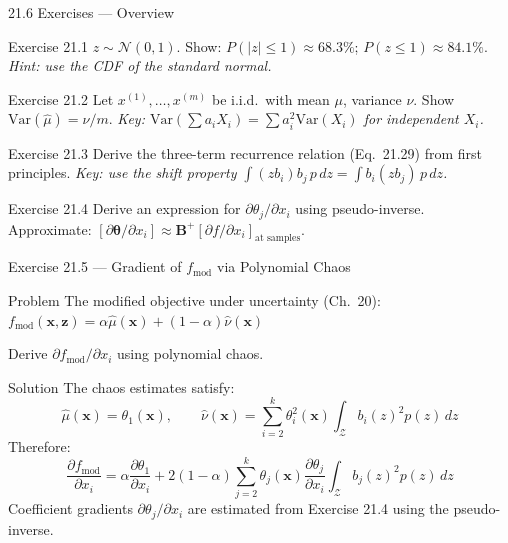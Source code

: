 \documentclass[aspectratio=169,10pt]{beamer}
\newcommand{\bx}{\mathbf{x}}
\newcommand{\bz}{\mathbf{z}}
\newcommand{\Var}{\mathrm{Var}}
\newcommand{\hmu}{\hat{\mu}}
\newcommand{\hnu}{\hat{\nu}}
\begin{document}
\begin{frame}{21.6 Exercises --- Overview}
  \begin{block}{Exercise 21.1}
    $z\sim\mathcal{N}(0,1)$.
    Show: $P(|z|\le 1)\approx 68.3\%$;\;
    $P(z\le 1)\approx 84.1\%$.
    \textit{Hint: use the CDF of the standard normal.}
  \end{block}

  \begin{block}{Exercise 21.2}
    Let $x^{(1)},\ldots,x^{(m)}$ be i.i.d.\ with mean $\mu$, variance $\nu$.
    Show $\Var(\hmu)=\nu/m$.
    \textit{Key: $\Var(\sum a_i X_i) = \sum a_i^2 \Var(X_i)$ for independent $X_i$.}
  \end{block}

  \begin{block}{Exercise 21.3}
    Derive the three-term recurrence relation (Eq.\ 21.29) from first principles.
    \textit{Key: use the shift property $\int(z b_i)b_j\,p\,dz = \int b_i(z b_j)\,p\,dz$.}
  \end{block}

  \begin{block}{Exercise 21.4}
    Derive an expression for $\partial\theta_j/\partial x_i$ using pseudo-inverse.
    Approximate: $[\partial\bm{\theta}/\partial x_i]
    \approx \mathbf{B}^{+}[\partial f/\partial x_i]_{\text{at samples}}$.
  \end{block}
\end{frame}

\begin{frame}{Exercise 21.5 --- Gradient of $f_{\text{mod}}$ via Polynomial Chaos}
  \begin{block}{Problem}
    The modified objective under uncertainty (Ch.~20):
    $f_{\text{mod}}(\bx,\bz) = \alpha\hmu(\bx) + (1-\alpha)\hnu(\bx)$

    Derive $\partial f_{\text{mod}}/\partial x_i$ using polynomial chaos.
  \end{block}

  \begin{block}{Solution}
    The chaos estimates satisfy:
    \[
      \hmu(\bx) = \theta_1(\bx),\qquad
      \hnu(\bx) = \sum_{i=2}^{k}\theta_i^2(\bx)\int_{\mathcal{Z}} b_i(z)^2 p(z)\,dz
    \]
    Therefore:
    \[
      \frac{\partial f_{\text{mod}}}{\partial x_i}
      = \alpha\frac{\partial\theta_1}{\partial x_i}
        + 2(1-\alpha)\sum_{j=2}^{k}\theta_j(\bx)
          \frac{\partial\theta_j}{\partial x_i}
          \int_{\mathcal{Z}} b_j(z)^2 p(z)\,dz
    \]
    Coefficient gradients $\partial\theta_j/\partial x_i$ are estimated
    from Exercise 21.4 using the pseudo-inverse.
  \end{block}
\end{frame}
\end{document}
